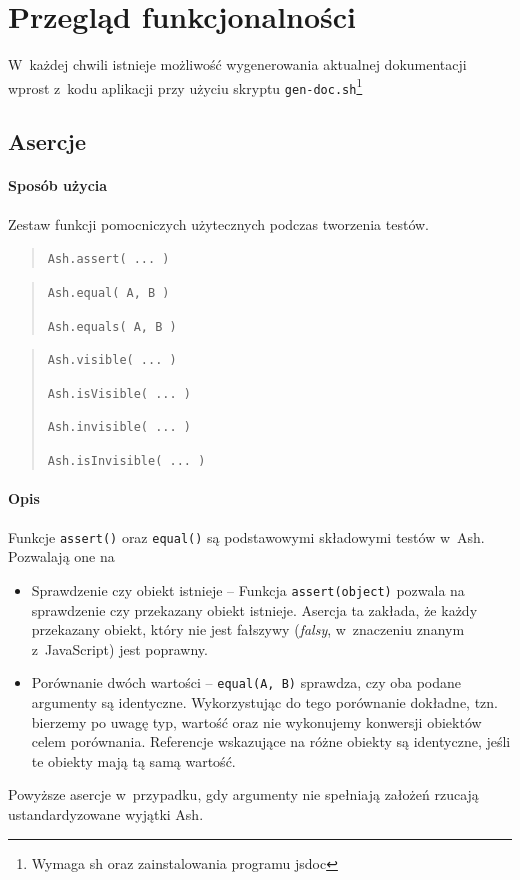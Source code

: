 \documentclass[brudnopis]{xmgr}
\begin{document}
\chapter{Przegląd funkcjonalności}

W~każdej chwili istnieje możliwość wygenerowania aktualnej dokumentacji wprost z~kodu aplikacji przy użyciu skryptu \texttt{gen-doc.sh}\footnote{Wymaga sh oraz zainstalowania programu jsdoc}

\section{Asercje}

\subsubsection{Sposób użycia}

Zestaw funkcji pomocniczych użytecznych podczas tworzenia testów.

\begin{quote}
  \texttt{Ash.assert( ... )} 
\end{quote}

\begin{quote}
  \texttt{Ash.equal( A, B )}

  \texttt{Ash.equals( A, B )} 
\end{quote}

\begin{quote}
  \texttt{Ash.visible( ... )} 

  \texttt{Ash.isVisible( ... )}

  \texttt{Ash.invisible( ... )}

  \texttt{Ash.isInvisible( ... )}
\end{quote}

\subsubsection{Opis}

Funkcje \texttt{assert()} oraz \texttt{equal()} są podstawowymi składowymi testów w~Ash. Pozwalają one na 

\begin{itemize}
  \item Sprawdzenie czy obiekt istnieje -- Funkcja \texttt{assert(object)} pozwala na sprawdzenie czy przekazany obiekt istnieje. Asercja ta zakłada, że każdy przekazany obiekt, który nie jest fałszywy (\textit{falsy}, w~znaczeniu znanym z~JavaScript) jest poprawny. 
  \item Porównanie dwóch wartości -- \texttt{equal(A, B)} sprawdza, czy oba podane argumenty są identyczne. Wykorzystując do tego porównanie dokładne, tzn. bierzemy po uwagę typ, wartość oraz nie wykonujemy konwersji obiektów celem porównania. Referencje wskazujące na różne obiekty są identyczne, jeśli te obiekty mają tą samą wartość.
\end{itemize}
Powyższe asercje w~przypadku, gdy argumenty nie spełniają założeń rzucają ustandardyzowane wyjątki Ash. 
\end{document}
